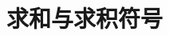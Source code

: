 \documentclass[../main.tex]{subfiles} %
\begin{document}
\chapter{求和与求积符号}





% 

% 

% 

% 

% 

% 

% 

% 
\end{document}
